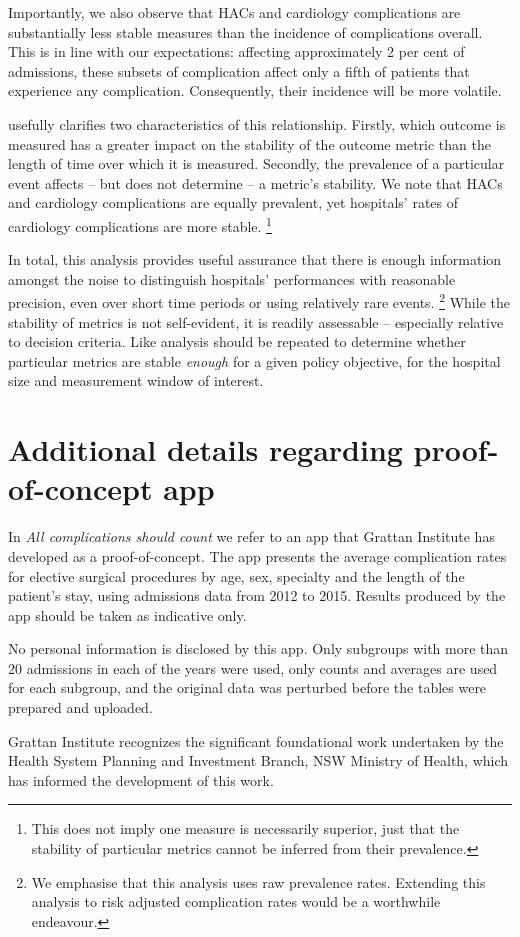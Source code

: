 \documentclass[submission]{grattan}
\begin{document}
Importantly, we also observe that HACs and cardiology complications are substantially less stable measures than the incidence of complications overall.
This is in line with our expectations: affecting approximately 2 per cent of admissions, these subsets of complication affect only a fifth of patients that experience any complication.
Consequently, their incidence will be more volatile.

 usefully clarifies two characteristics of this relationship.
Firstly, which outcome is measured has a greater impact on the stability of the outcome metric than the length of time over which it is measured.
Secondly, the prevalence of a particular event affects -- but does not determine -- a metric's stability.
We note that HACs and cardiology complications are equally prevalent, yet hospitals' rates of cardiology complications are more stable.%
\footnote{This does not imply one measure is necessarily superior, just that the stability of particular metrics cannot be inferred from their prevalence.}



In total, this analysis provides useful assurance that there is enough information amongst the noise to distinguish hospitals' performances with reasonable precision, even over short time periods or using relatively rare events.%
	\footnote{We emphasise that this analysis uses raw prevalence rates.
	Extending this analysis to risk adjusted complication rates would be a worthwhile endeavour.}
While the stability of metrics is not self-evident, it is readily assessable -- especially relative to decision criteria.
Like analysis should be repeated to determine whether particular metrics are stable \emph{enough} for a given policy objective, for the hospital size and measurement window of interest.


\chapter{Additional details regarding proof-of-concept app}\label{chap:app-disclaimer}
In \emph{All complications should count} we refer to an app that Grattan Institute has developed as a proof-of-concept. The app presents the average complication rates for elective surgical procedures by age, sex, specialty and the length of the patient's stay, using admissions data from 2012 to 2015. Results produced by the app should be taken as indicative only.

No personal information is disclosed by this app.
Only subgroups with more than 20 admissions in each of the years were used, 
only counts and averages are used for each subgroup, and
the original data was perturbed before the tables were prepared and uploaded.

Grattan Institute recognizes the significant foundational work undertaken by the Health System Planning and Investment Branch, NSW Ministry of Health, which has informed the development of this work.


\printbibliography
\end{document}

